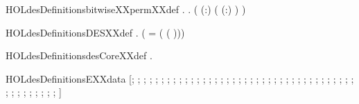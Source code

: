 \newcommand{\HOLdesDate}{23 Ottobre 2024}
\newcommand{\HOLdesTime}{10:14}
\begin{SaveVerbatim}{HOLdesDefinitionsbitwiseXXpermXXdef}
\HOLTokenTurnstile{} \HOLSymConst{\HOLTokenForall{}} .
        \HOLSymConst{=}
      .
         ( (:\alpha{}) \HOLSymConst{\ensuremath{-}}  ( (:\beta{}) \HOLSymConst{\ensuremath{-}}  \HOLSymConst{\ensuremath{-}} ) )
\end{SaveVerbatim}
\newcommand{\HOLdesDefinitionsbitwiseXXpermXXdef}{\UseVerbatim{HOLdesDefinitionsbitwiseXXpermXXdef}}
\begin{SaveVerbatim}{HOLdesDefinitionsDESXXdef}
\HOLTokenTurnstile{} \HOLSymConst{\HOLTokenForall{}} .
        \HOLSymConst{=}
     (
         =   
        (  \HOLSymConst{,}  ( )))
\end{SaveVerbatim}
\newcommand{\HOLdesDefinitionsDESXXdef}{\UseVerbatim{HOLdesDefinitionsDESXXdef}}
\begin{SaveVerbatim}{HOLdesDefinitionsdesCoreXXdef}
\HOLTokenTurnstile{} \HOLSymConst{\HOLTokenForall{}} .
        \HOLSymConst{=}  \HOLConst{\HOLTokenCompose}  \HOLConst{\HOLTokenCompose}     \HOLConst{\HOLTokenCompose}  \HOLConst{\HOLTokenCompose} 
\end{SaveVerbatim}
\newcommand{\HOLdesDefinitionsdesCoreXXdef}{\UseVerbatim{HOLdesDefinitionsdesCoreXXdef}}
\begin{SaveVerbatim}{HOLdesDefinitionsEXXdata}
\HOLTokenTurnstile{}  \HOLSymConst{=}
   [; ; ; ; ; ; ; ; ; ; ; ; ; ; ; ; ; ;
    ; ; ; ; ; ; ; ; ; ; ; ; ; ; ;
    ; ; ; ; ; ; ; ; ; ; ; ; ; ; ]
\end{SaveVerbatim}
